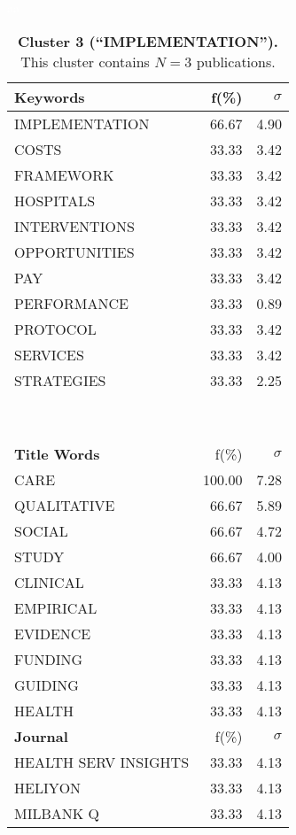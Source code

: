 \documentclass[a4paper,11pt]{report}
\begin{document}
\begin{landscape}
\begin{table}[!ht]
\caption*{{\bf Cluster 3 (``IMPLEMENTATION'').} This cluster contains $N = 3$ publications.} 
\textcolor{white}{aa}\\
{\scriptsize\begin{tabular}{|p{5cm} r r|}
\hline
{\bf Keywords }& f(\%) & $\sigma$\\
\hline
IMPLEMENTATION & 66.67 & 4.90\\
COSTS & 33.33 & 3.42\\
FRAMEWORK & 33.33 & 3.42\\
HOSPITALS & 33.33 & 3.42\\
INTERVENTIONS & 33.33 & 3.42\\
OPPORTUNITIES & 33.33 & 3.42\\
PAY & 33.33 & 3.42\\
PERFORMANCE & 33.33 & 0.89\\
PROTOCOL & 33.33 & 3.42\\
SERVICES & 33.33 & 3.42\\
STRATEGIES & 33.33 & 2.25\\
 &  & \\
 &  & \\
 &  & \\
 &  & \\
 &  & \\
 &  & \\
 &  & \\
 &  & \\
 &  & \\
\hline
{\bf Title Words }& f(\%) & $\sigma$\\
\hline
CARE & 100.00 & 7.28\\
QUALITATIVE & 66.67 & 5.89\\
SOCIAL & 66.67 & 4.72\\
STUDY & 66.67 & 4.00\\
CLINICAL & 33.33 & 4.13\\
EMPIRICAL & 33.33 & 4.13\\
EVIDENCE & 33.33 & 4.13\\
FUNDING & 33.33 & 4.13\\
GUIDING & 33.33 & 4.13\\
HEALTH & 33.33 & 4.13\\
\hline
{\bf Journal }& f(\%) & $\sigma$\\
\hline
HEALTH SERV INSIGHTS & 33.33 & 4.13\\
HELIYON & 33.33 & 4.13\\
MILBANK Q & 33.33 & 4.13\\

\end{tabular}}
\end{table}
\end{landscape}
\end{document}
